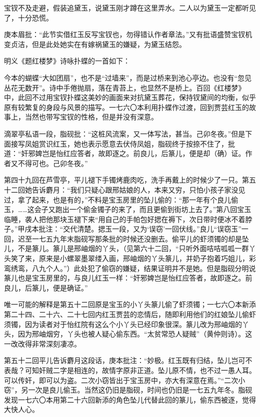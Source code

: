 \par 宝钗不及走避，假装追黛玉，说黛玉刚才蹲在这里弄水。二人以为黛玉一定都听见了，十分恐慌。
\par 庚本眉批：“此节实借红玉反写宝钗也，勿得错认作者章法。”又有批语盛赞宝钗机变贞洁，但是此处她实在有嫁祸黛玉的嫌疑，为黛玉结怨。
\par 明义《题红楼梦》诗咏扑蝶的一首如下：
\par 今本的蝴蝶“大如团扇”，也不是“过墙来”，而是过桥来到池心亭边。也没有“忽见丛花无数开”。诗中手倦抛扇，落在青苔上，也显然不是桥上。百回《红楼梦》中，此回不过用宝钗扑蝶这美妙的画面来对抗黛玉葬花，保持钗黛间的均衡，似乎原有较繁复的身段与风景的描写。一七六〇本利用扑蝶作过渡，回到贾芸红玉的故事上，当然也带写宝钗的性格，但是并没有深意。
\par 滴翠亭私语一段，脂砚批：“这桩风流案，又一体写法，甚当。己卯冬夜。”但是下面接写凤姐赏识红玉，她也表示愿意去伏侍凤姐，脂砚终于按捺不住了，批道：“奸邪婢岂是怡红应答者，故即逐之。前良儿，后篆儿，便是却（确）证。作者又不得可也。己卯冬夜。”
\par 第四十九回在芦雪亭，平儿褪下手镯烤鹿肉吃，洗手再戴上的时候少了一只。第五十二回她告诉麝月：“我们只疑心跟邢姑娘的人，本来又穷，只怕小孩子家没见过，拿了起来，也是有的，”不料是宝玉房里的坠儿偷的：“那一年有个良儿偷玉，……这会子又跑出一个偷金镯子的来了，而且更偷到街坊上去了。”第八回宝玉临睡，袭人把他那块玉褪下来“用自己的手帕包好揌在褥下，次日带时便冰不着脖子。”甲戌本批注：“交代清楚。揌玉一段，又为‘误窃’一回伏线。”良儿“误窃玉”一回，迟至一七五九年末脂砚写那条批的时候还没删去。偷平儿的虾须镯的却是坠儿，不是篆儿。篆儿是邢岫烟的丫头，（见第六十二回，“只听外面咭咭呱呱一群丫头笑了来，原来是小螺翠墨翠缕入画，邢岫烟的丫头篆儿，并奶子抱着巧姐儿，彩鸾绣鸾，八九个人。”）此处犯了偷窃的嫌疑，结果证明并不是她。但是脂砚分明说篆儿也是宝玉房里的，与良儿红玉一样：“奸邪婢岂是怡红应答者，故即逐之。前良儿，后篆儿，便是确证。”
\par 唯一可能的解释是第五十二回原是宝玉的小丫头篆儿偷了虾须镯；一七六〇本新添第二十四、二十六、二十七回内红玉贾芸的恋情后，随即利用他们的红娘坠儿偷虾须镯，因为读者对于怡红院有这么个小丫头已经印象很深。篆儿改为邢岫烟的丫头，因为邢岫烟穷，丫头也被人疑心偷东西。“太贫常恐人疑贼”（黄仲则诗）。这一改改得非常深刻凄凉。
\par 第五十二回平儿告诉麝月这段话，庚本批注：“妙极。红玉既有归结，坠儿岂可不表哉？可知奸贼二字是相连的，故情字原非正道。坠儿原不情，也不过一愚人耳。可以传奸，即可以为盗。二次小窃皆出于宝玉房中，亦大有深意在焉。”“二次小窃”，另一次是良儿偷玉。当然这仍旧是脂砚，时间也仍旧是一七五九年冬。脂砚发现一七六〇本用第二十六回新添的角色坠儿代替此回的篆儿，偷东西被逐，觉得大快人心。
